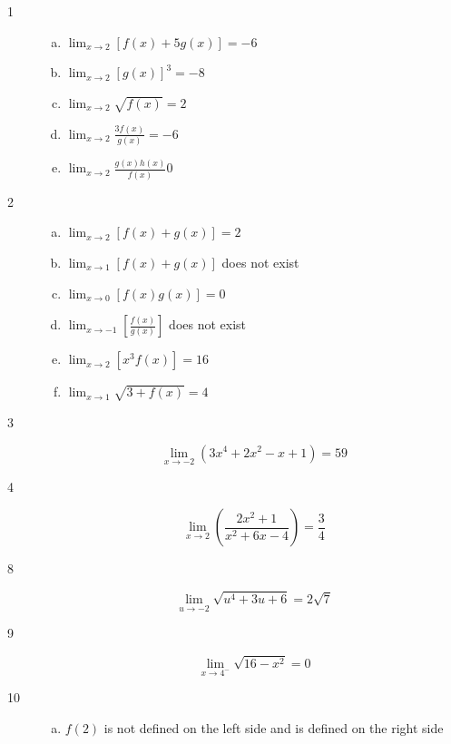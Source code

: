 \documentclass[letterpaper]{exam}
\begin{document}
    \begin{description}

      \item[1]
        \begin{enumerate}[(a)]
          \item $\lim_{x \to 2} \left[ f(x) + 5g(x) \right] = \boxed{ -6 }$
          \item $\lim_{x \to 2} \left[ g(x) \right]^3 = \boxed{ -8 }$
          \item $\lim_{x \to 2} \sqrt{f(x)} = \boxed{ 2 }$
          \item $\lim_{x \to 2} \frac{3 f(x)}{g(x)} = \boxed{ -6 }$
          \item $\lim_{x \to 2} \frac{g(x) h(x)}{f(x)} \boxed{ 0 }$ 
        \end{enumerate}

      \item[2]
        \begin{enumerate}[(a)]
          \item $\lim_{x \to 2} \left[ f(x) + g(x) \right] = \boxed{ 2 }$
          \item $\lim_{x \to 1} \left[ f(x) + g(x) \right]$ does not exist 
          \item $\lim_{x \to 0} \left[ f(x) g(x) \right] = \boxed{ 0 } $ 
          \item $\lim_{x \to -1} \left[ \frac{f(x)}{g(x)} \right]$ does not exist
          \item $\lim_{x \to 2} \left[ x^3 f(x) \right] = \boxed{ 16 } $ 
          \item $\lim_{x \to 1} \sqrt{3 + f(x)} = \boxed{ 4 }$ 
        \end{enumerate}

      \item[3]
        \[
          \lim_{x \to -2} \left( 3x^4 + 2x^2 - x + 1 \right) = \boxed{ 59 }
        \]

      \item[4]
        \[
          \lim_{x \to 2} \left( \frac{2x^2 + 1}{x^2 + 6x - 4} \right) 
              = \boxed{ \frac{3}{4} }
        \]

      \item[8]
        \[
          \lim_{u \to -2} \sqrt{ u^4 + 3u + 6} = \boxed{ 2 \sqrt{7} }
        \]

      \item[9]
        \[
          \lim_{x \to 4^-} \sqrt{ 16 - x^2 } = \boxed{ 0 }
        \]

      \item[10]
        \begin{enumerate}[(a)]
          \item $f(2)$ is not defined on the left side and is defined on the
            right side


\end{enumerate}
\end{description}
\end{document}
